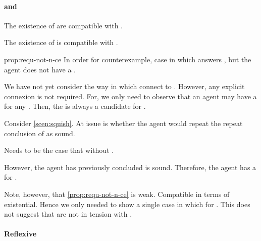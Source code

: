 \paragraph*{ and \issueConstraint{}}

\begin{note}
  The existence of  are compatible with \issueConstraint{}.
  \begin{proposition}
    \label{prop:requ-not-n-ce}
    The existence of  is compatible with \issueConstraint{}.
  \end{proposition}
  \begin{argument}{prop:requ-not-n-ce}
    In order for counterexample, case in which \ros{} answers \qWhyV{}, but the agent does not have a \wit{}.

    We have not yet consider the way in which  connect to \qWhyV{}.
    However, any explicit connexion is not required.
    For, we only need to observe that an agent may have a \wit{} for any \requ{}.
    Then, the \wit{} is always a candidate for \qHowV{}.

    Consider \autoref{scen:squish}.
    At issue is whether the agent would repeat the repeat conclusion of \sqE{} as sound.

    Needs to be the case that \ros{} without \wit{}.

    However, the agent has previously concluded \sqE{} is sound.
    Therefore, the agent has a \wit{} for \ros{}.
  \end{argument}

  Note, however, that \autoref{prop:requ-not-n-ce} is weak.
  Compatible in terms of existential.
  Hence we only needed to show a single case in which \wit{} for \requ{}.
  This does not suggest that  are not in tension with \issueConstraint{}.
\end{note}

\paragraph*{Reflexive }

